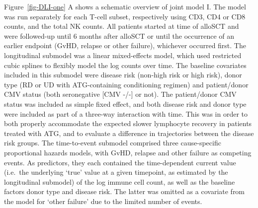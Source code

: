\documentclass[
  letterpaper,
  paper=240mm:170mm,
  twoside=true,
  open=right,
  fontsize=10pt,
  pagesize=false,
  BCOR=15mm,
  DIV=14,
  headinclude=true,
  footinclude=false,
  headsepline=on]{scrbook}
\begin{document}
Figure~\ref{fig-DLI-one} A shows a schematic overview of joint model I.
The model was run separately for each T-cell subset, respectively using
CD3, CD4 or CD8 counts, and the total NK counts. All patients started at
time of alloSCT and were followed-up until 6 months after alloSCT or
until the occurrence of an earlier endpoint (GvHD, relapse or other
failure), whichever occurred first. The longitudinal submodel was a
linear mixed-effects model, which used restricted cubic splines to
flexibly model the log counts over time. The baseline covariates
included in this submodel were disease risk (non-high risk or high
risk), donor type (RD or UD with ATG-containing conditioning regimen)
and patient/donor CMV status (both seronegative {[}CMV -/-{]} or not).
The patient/donor CMV status was included as simple fixed effect, and
both disease risk and donor type were included as part of a three-way
interaction with time. This was in order to both properly accommodate
the expected slower lymphocyte recovery in patients treated with ATG,
and to evaluate a difference in trajectories between the disease risk
groups. The time-to-event submodel comprised three cause-specific
proportional hazards models, with GvHD, relapse and other failure as
competing events. As predictors, they each contained the time-dependent
current value (i.e.~the underlying `true' value at a given timepoint, as
estimated by the longitudinal submodel) of the log immune cell count, as
well as the baseline factors donor type and disease risk. The latter was
omitted as a covariate from the model for `other failure' due to the
limited number of events.
\end{document}
